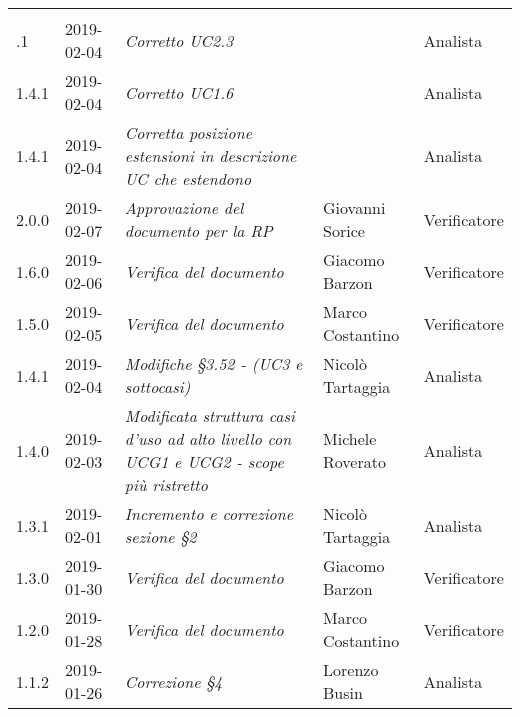 \newpage 
\section*{}
	\begin{longtable}{C{2cm}|C{2.5cm}|C{4.5cm}|C{2.5cm}|C{3cm}}

	 &  &  &  &   \\
	.1 & 2019-02-04 & \emph{Corretto UC2.3} &  & Analista \\
		\hline
		
		1.4.1 & 2019-02-04 & \emph{Corretto UC1.6} &  & Analista \\
		\hline
	
	    1.4.1 & 2019-02-04 & \emph{Corretta posizione estensioni in descrizione UC che estendono} &  & Analista \\
	    \hline
	
		2.0.0 & 2019-02-07 & \emph{Approvazione del documento per la RP} & Giovanni Sorice & Verificatore \\
		\hline
	
		1.6.0 & 2019-02-06 & \emph{Verifica del documento} & Giacomo Barzon & Verificatore \\
		\hline
		
		1.5.0 & 2019-02-05 & \emph{Verifica del documento} & Marco Costantino & Verificatore \\
		\hline
	
		1.4.1 & 2019-02-04 & \emph{Modifiche §3.52 -  (UC3 e sottocasi)} & Nicolò Tartaggia & Analista \\
		\hline
	
		1.4.0 & 2019-02-03 & \emph{Modificata struttura casi d'uso ad alto livello con UCG1 e UCG2 - scope più ristretto} & Michele Roverato & Analista \\
		\hline
	
		1.3.1 & 2019-02-01 & \emph{Incremento e correzione sezione §2} & Nicolò Tartaggia & Analista \\
		\hline
	
		1.3.0 & 2019-01-30 & \emph{Verifica del documento} & Giacomo Barzon & Verificatore \\
		\hline
		
		1.2.0 & 2019-01-28 & \emph{Verifica del documento} & Marco Costantino & Verificatore \\
		\hline
	
		1.1.2 & 2019-01-26 & \emph{Correzione §4} & Lorenzo Busin & Analista \\
		\hline
	

\end{longtable}
